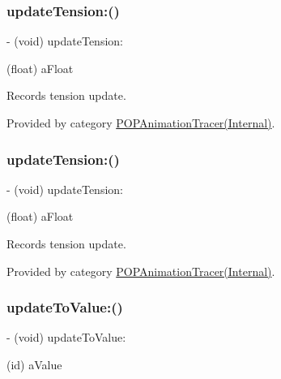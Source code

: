 \subsubsection{\texorpdfstring{update\+Tension\+:()}{updateTension:()}\hspace{0.1cm}{\footnotesize\ttfamily [1/2]}}
{\footnotesize\ttfamily -\/ (void) update\+Tension\+: \begin{DoxyParamCaption}\item[{(float)}]{a\+Float }\end{DoxyParamCaption}}

Records tension update. 

Provided by category \mbox{\hyperlink{category_p_o_p_animation_tracer_07_internal_08_a5010bbc6fa2ec5426d33706651e584de}{P\+O\+P\+Animation\+Tracer(\+Internal)}}.

\mbox{\label{interface_p_o_p_animation_tracer_a5010bbc6fa2ec5426d33706651e584de}} 
\subsubsection{\texorpdfstring{update\+Tension\+:()}{updateTension:()}\hspace{0.1cm}{\footnotesize\ttfamily [2/2]}}
{\footnotesize\ttfamily -\/ (void) update\+Tension\+: \begin{DoxyParamCaption}\item[{(float)}]{a\+Float }\end{DoxyParamCaption}}

Records tension update. 

Provided by category \mbox{\hyperlink{category_p_o_p_animation_tracer_07_internal_08_a5010bbc6fa2ec5426d33706651e584de}{P\+O\+P\+Animation\+Tracer(\+Internal)}}.

\mbox{\label{interface_p_o_p_animation_tracer_a00d4c0e1b6b446081cfb6c153f37a633}} 
\subsubsection{\texorpdfstring{update\+To\+Value\+:()}{updateToValue:()}\hspace{0.1cm}{\footnotesize\ttfamily [1/2]}}
{\footnotesize\ttfamily -\/ (void) update\+To\+Value\+: \begin{DoxyParamCaption}\item[{(id)}]{a\+Value }\end{DoxyParamCaption}}

